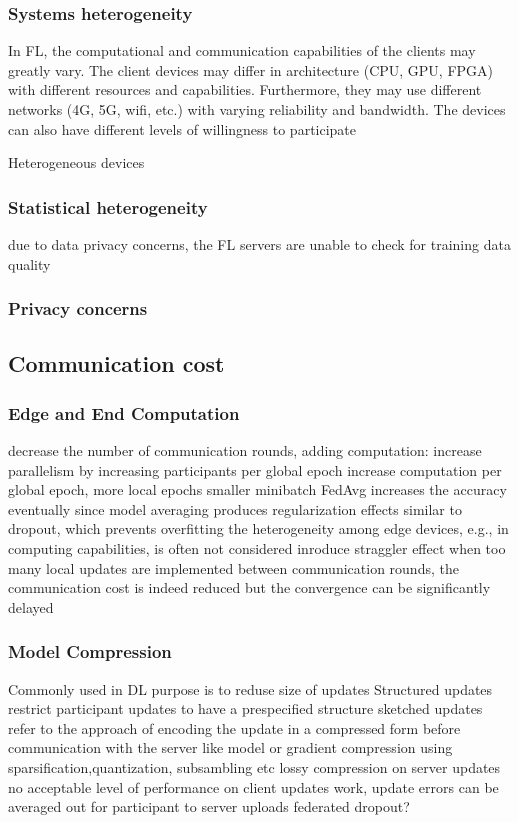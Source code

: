     \subsubsection{Systems heterogeneity} %
    In FL, the computational and communication capabilities of the clients may greatly vary. The client devices may differ in architecture (CPU, GPU, FPGA) with different resources and capabilities. Furthermore, they may use different networks (4G, 5G, wifi, etc.) with varying reliability and bandwidth. The devices can also have different levels of willingness to participate
    
    Heterogeneous devices
    \subsubsection{Statistical heterogeneity} %
    due to data privacy concerns, the FL servers are unable to check for training data quality
    \subsubsection{Privacy concerns} %


\subsection{Communication cost}
    \subsubsection{Edge and End Computation}
    decrease the number of communication rounds, adding computation:
    increase parallelism by increasing participants per global epoch
    increase computation per global epoch, more local epochs smaller minibatch
    FedAvg increases the accuracy eventually since model averaging produces regularization effects similar to dropout, which prevents overfitting
    the heterogeneity among edge devices, e.g., in computing capabilities, is often not considered
    inroduce straggler effect
    when too many local updates are implemented between communication rounds, the communication cost is indeed reduced but the convergence can be significantly delayed
    \subsubsection{Model Compression}
    Commonly used in DL
    purpose is to reduse size of updates
    Structured updates restrict participant updates to have a prespecified structure
    sketched updates refer to the approach of encoding the update in a compressed form before communication with the server like
    model or gradient compression using sparsification,quantization, subsambling etc
    lossy compression on server updates no acceptable level of performance 
    on client updates work, update errors can be averaged out for participant to server uploads
    federated dropout?
